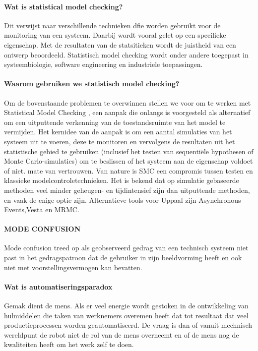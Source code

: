 \documentclass{article}
\begin{document}
	\paragraph{Wat is statistical model checking?}
	Dit verwijst naar verschillende technieken dfie worden gebruikt voor de monitoring van een systeem. Daarbij wordt vooral gelet op een specifieke eigenschap. Met de resultaten van de statsitieken wordt de juistheid van een ontwerp beoordeeld. Statistisch model checking wordt onder andere toegepast in systeembiologie, software engineering en industriele toepassingen.
	\cite{inriaStatsMoodCheck}
	\cite{ buddeModelChecker}
	
	\paragraph{Waarom gebruiken we statistisch model checking?}
	Om de bovenstaande problemen te overwinnen stellen we voor om te werken met Statistical Model Checking , een aanpak die onlangs is voorgesteld als alternatief om een uitputtende verkenning van de toestandsruimte van het model te vermijden. Het kernidee van de aanpak is om een aantal simulaties van het systeem uit te voeren, deze te monitoren en vervolgens de resultaten uit het statistische gebied te gebruiken (inclusief het testen van sequentiële hypothesen of Monte Carlo-simulaties) om te beslissen of het systeem aan de eigenschap voldoet of niet. mate van vertrouwen. Van nature is SMC een compromis tussen testen en klassieke modelcontroletechnieken. Het is bekend dat op simulatie gebaseerde methoden veel minder geheugen- en tijdintensief zijn dan uitputtende methoden, en vaak de enige optie zijn.
	\cite{inriaStatsMoodCheck}Alternatieve tools voor Uppaal zijn Asynchronous Events,Vesta en MRMC.
	
	
	\paragraph{MODE CONFUSION }
	Mode confusion treed op als geobserveerd gedrag van een technisch systeem niet past in het gedragspatroon dat de gebruiker in zijn beeldvorming heeft  en ook niet met voorstellingsvermogen kan bevatten.
	
	\paragraph{Wat is automatiseringsparadox}
	Gemak dient de mens. Als er veel energie wordt gestoken in de ontwikkeling van hulmiddelen die taken van werknemers overemen heeft dat tot resultaat dat veel productieprocessen worden geautomatiseerd. De vraag is dan of vanuit mechnisch wereldpunt de robot niet de rol van de mens overneemt en of de mens nog de kwaliteiten heeft om het werk zelf te doen.
	\cite{bicker21102016automatiseringsparadox}
	\cite{vseautoparadox}
	\cite{blogxot21112016slimapparaat}
	
\end{document}
